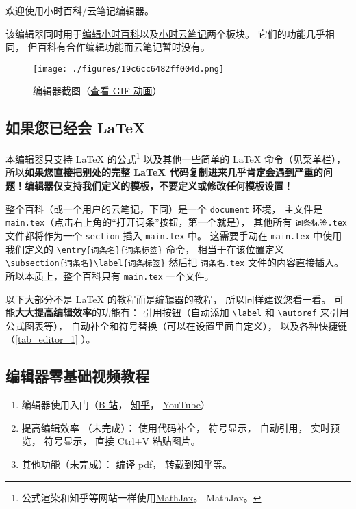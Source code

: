 
欢迎使用小时百科/云笔记编辑器。

该编辑器同时用于\href{https://wuli.wiki/editor/}{编辑小时百科}以及\href{https://wuli.wiki/note/}{小时云笔记}两个板块。 它们的功能几乎相同， 但百科有合作编辑功能而云笔记暂时没有。
\begin{figure}[ht]
\centering
\texttt{[image: ./figures/19c6cc6482ff004d.png]}
\caption{编辑器截图（\href{https://wuli.wiki/apps/editor.gif}{查看 GIF 动画}）} \label{fig_editor_3}
\end{figure}

\subsection{如果您已经会 LaTeX}
本编辑器只支持 LaTeX 的公式\footnote{公式渲染和知乎等网站一样使用\href{https://www.mathjax.org/}{MathJax}。 MathJax。} 以及其他一些简单的 LaTeX 命令（见菜单栏）， 所以\textbf{如果您直接把别处的完整 LaTeX 代码复制进来几乎肯定会遇到严重的问题！编辑器仅支持我们定义的模板，不要定义或修改任何模板设置！}

整个百科（或一个用户的云笔记，下同）是一个 \verb|document| 环境， 主文件是 \verb|main.tex|（点击右上角的“打开词条”按钮，第一个就是）， 其他所有 \verb|词条标签.tex| 文件都将作为一个 \verb|section| 插入 \verb|main.tex| 中。 这需要手动在 \verb|main.tex| 中使用我们定义的 \verb|\entry{词条名}{词条标签}| 命令， 相当于在该位置定义 \verb|\subsection{词条名}\label{词条标签}| 然后把 \verb|词条名.tex| 文件的内容直接插入。 所以本质上，整个百科只有 \verb|main.tex| 一个文件。

以下大部分不是 LaTeX 的教程而是编辑器的教程， 所以同样建议您看一看。 可能\textbf{大大提高编辑效率}的功能有： 引用按钮（自动添加 \verb|\label| 和 \verb|\autoref| 来引用公式图表等）， 自动补全和符号替换（可以在设置里面自定义）， 以及各种快捷键（\autoref{tab_editor_1} ）。

\subsection{编辑器零基础视频教程}
\begin{enumerate}
\item 编辑器使用入门（\href{https://www.bilibili.com/video/av87698355/}{B 站}， \href{https://zhuanlan.zhihu.com/p/105869878}{知乎}， \href{https://www.youtube.com/watch?v=AN2tXNanD9U&t=1s}{YouTube}）
\item 提高编辑效率 （未完成）： 使用代码补全， 符号显示， 自动引用， 实时预览， 符号显示， 直接 Ctrl+V 粘贴图片。
\item 其他功能（未完成）： 编译 pdf， 转载到知乎等。
\end{enumerate}

